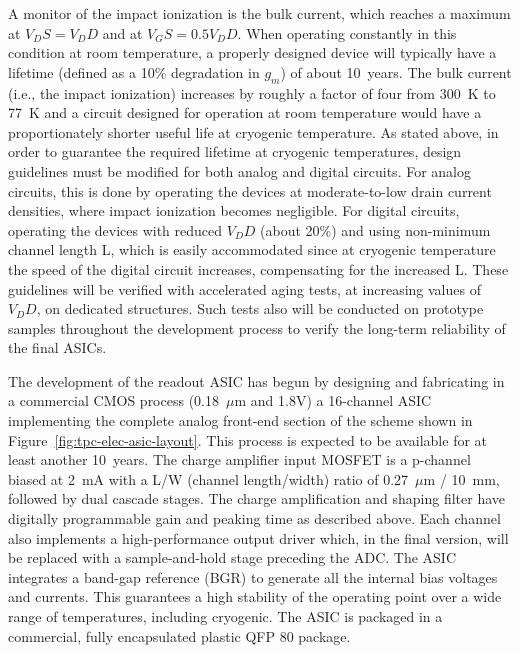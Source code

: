 A monitor of the impact ionization is the bulk current, which reaches a maximum at $V_DS = V_DD$ and at $V_GS = 0.5 V_DD$. 
When operating constantly in this condition at room temperature, a properly designed device 
will typically have a lifetime (defined as a 10\% degradation in $g_m$) of about 10~years. 
The bulk current (i.e., the impact ionization) increases by roughly a factor of four from 300~K to 77~K 
\cite{CMOS-reliability} and a circuit designed for operation at room temperature would have 
a proportionately shorter useful life at cryogenic temperature. As stated above, in order to guarantee 
the required lifetime at cryogenic temperatures, design guidelines must be modified for both analog 
and digital circuits. For analog circuits, this is done by operating the devices at moderate-to-low 
drain current densities, where impact ionization becomes negligible. For digital circuits, 
operating the devices with reduced $V_DD$ (about 20\%) and using non-minimum channel length L, 
which is easily accommodated since at cryogenic temperature the speed of the digital circuit increases, 
compensating for the increased L. These guidelines will be verified with accelerated aging tests, 
at increasing values of $V_DD$, on dedicated structures. Such tests also will be conducted on 
prototype samples throughout the development process to verify the long-term reliability of the final ASICs.

The development of the readout ASIC has begun by designing and fabricating in a commercial CMOS
process (0.18~$\mu$m and 1.8V) a 16-channel
ASIC implementing the complete analog front-end section of the scheme shown in Figure~\ref{fig:tpc-elec-asic-layout}. 
This process is expected to be available for at least another 10~years. 
The charge
amplifier input MOSFET is a p-channel biased at 2~mA with a L/W (channel length/width) ratio
of 0.27~$\mu$m / 10~mm, followed by dual
cascade stages. The charge amplification and shaping filter have
digitally programmable gain and peaking time as described above. Each
channel also implements a high-performance output driver which, in the
final version, will be replaced with a sample-and-hold stage preceding
the ADC. The ASIC integrates a band-gap reference (BGR)  to
generate all the internal bias voltages and currents. This guarantees a
high stability of the operating point over a wide range of
temperatures, including cryogenic. The ASIC is packaged in a
commercial, fully encapsulated plastic QFP 80 package.

